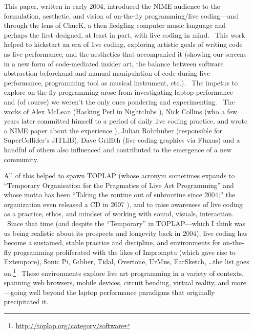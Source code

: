This paper, written in early 2004, introduced the NIME audience to the formulation, aesthetic, and vision of on-the-fly programming/live coding---and through the lens of ChucK, a then fledgling computer music language and perhaps the first designed, at least in part, with live coding in mind.  This work helped to kickstart an era of live coding, exploring artistic goals of writing code as live performance, and the aesthetics that accompanied it (showing our screens in a new form of code-mediated insider art, the balance between software abstraction beforehand and manual manipulation of code during live performance, programming tool as musical instrument, etc.).  The impetus to explore on-the-fly programming arose from investigating laptop performance---and (of course) we weren't the only ones pondering and experimenting.  The works of Alex McLean (Hacking Perl in Nightclubs \cite{McLean:2004}), Nick Collins (who a few years later committed himself to a period of daily live coding practice, and wrote a NIME paper about the experience \cite{Collins:2007}), Julian Rohrhuber (responsible for SuperCollider's JITLIB), Dave Griffith (live coding graphics via Fluxus) and a handful of others also influenced and contributed to the emergence of a new community.

All of this helped to spawn TOPLAP (whose acronym sometimes expands to ``Temporary Organisation for the Pragmatics of Live Art Programming'' and whose motto has been ``Taking the routine out of subroutine since 2004;'' the organization even released a CD in 2007 \cite{TOPLAP:2007}), and to raise awareness of live coding as a practice, ethos, and mindset of working with sound, visuals, interaction.  Since that time (and despite the ``Temporary'' in TOPLAP---which I think was us being realistic about its prospects and longevity back in 2004), live coding has become a sustained, stable practice and discipline, and environments for on-the-fly programming proliferated with the likes of Impromptu (which gave rise to Extempore), Sonic Pi, Gibber, Tidal, Overtone, UrMus, EarSketch, \ldots the list goes on.\footnote{\url{http://toplap.org/category/software}}  These environments explore live art programming in a variety of contexts, spanning web browsers, mobile devices, circuit bending, virtual reality, and more---going well beyond the laptop performance paradigms that originally precipitated it.

